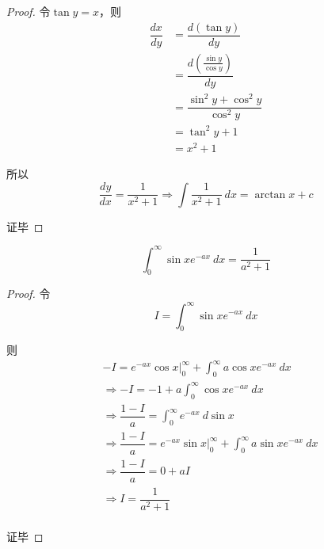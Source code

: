        \begin{proof}
            令$\tan y = x$，则
            \begin{equation*}
                \begin{split}
                    \dfrac{dx}{dy}&=\dfrac{d(\tan y)}{dy}\\
                    &=\dfrac{d(\frac{\sin y}{\cos y})}{dy}\\
                    &=\dfrac{\sin^2 y+\cos^2 y}{\cos^2 y}\\
                    &=\tan^2 y+1\\
                    &=x^2+1
                \end{split}
            \end{equation*}
            
            所以
            \begin{equation*}
                \dfrac{dy}{dx}=\dfrac{1}{x^2+1}\Rightarrow\int \dfrac{1}{x^2 + 1}\ dx=\arctan x+c
            \end{equation*}

            证毕
        \end{proof}
        \begin{lemma}
            \begin{equation}
                \int_{0}^{\infty}\sin x e^{-ax}\ dx=\dfrac{1}{a^2+1}
                \label{eq: 2.15}
            \end{equation}
        \end{lemma}
        \begin{proof}
            令
            \begin{equation*}
                I=\int_{0}^{\infty}\sin x e^{-ax}\ dx
            \end{equation*}
            
            则
            \begin{equation*}
                \begin{split}
                    &-I=e^{-ax}\cos x\bigg|_{0}^{\infty}+\int_{0}^{\infty}a\cos x e^{-ax}\ dx\\
                    &\Rightarrow -I=-1+a\int_{0}^{\infty}\cos x e^{-ax}\ dx\\
                    &\Rightarrow \dfrac{1-I}{a}=\int_{0}^{\infty} e^{-ax}\ d\sin x\\
                    &\Rightarrow \dfrac{1-I}{a}=e^{-ax}\sin x\bigg|_{0}^{\infty}+\int_{0}^{\infty} a\sin x e^{-ax}\ dx\\
                    &\Rightarrow \dfrac{1-I}{a}=0+aI\\
                    &\Rightarrow I=\dfrac{1}{a^2+1}\\
                \end{split}
            \end{equation*}

            证毕
        \end{proof}

